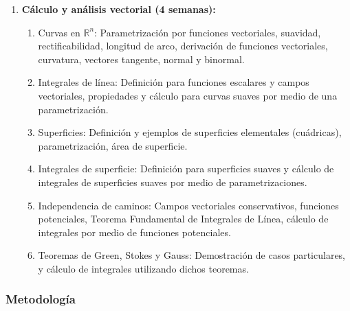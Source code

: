 \begin{refsection}
\begin{enumerate}
\item \textbf{C\'alculo y an\'alisis vectorial (4 semanas):} 
\begin{enumerate}
\item Curvas en $\mathbb{R}^n$: Parametrizaci\'on por funciones vectoriales, suavidad, rectificabilidad, longitud de arco, derivaci\'on de funciones vectoriales, curvatura, vectores tangente, normal y binormal.
\item Integrales de l\'inea: Definici\'on para funciones escalares y campos vectoriales, propiedades y c\'alculo para curvas suaves por medio de una parametrizaci\'on.
\item Superficies: Definici\'on y ejemplos de superficies elementales (cu\'adricas), parametrizaci\'on, \'area de superficie.
\item Integrales de superficie: Definici\'on para superficies suaves y c\'alculo de integrales de superficies suaves por medio de parametrizaciones. 
\item Independencia de caminos: Campos vectoriales conservativos, funciones potenciales, Teorema Fundamental de Integrales de L\'inea, c\'alculo de integrales por medio de funciones potenciales. 
\item Teoremas de Green, Stokes y Gauss: Demostraci\'on de casos particulares, y c\'alculo de integrales utilizando dichos teoremas. 
\end{enumerate}

\end{enumerate}

\subsubsection*{Metodología}


\end{refsection}
